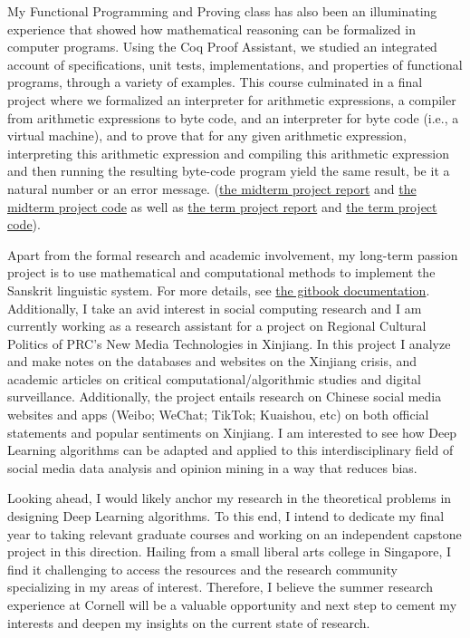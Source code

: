 \documentclass[11pt,reqno,oneside,a4paper]{article}
\begin{document}
	My Functional Programming and Proving class has also been an illuminating experience that showed how mathematical reasoning can be formalized in computer programs. Using the Coq Proof Assistant, we studied an integrated account of specifications, unit tests, implementations, and properties of functional programs, through a variety of examples. This course culminated in a final project where we formalized an interpreter for arithmetic expressions, a compiler from arithmetic expressions to byte code, and an interpreter for byte code (i.e., a virtual machine), and to prove that for any given arithmetic expression, interpreting this arithmetic expression and compiling this arithmetic expression and then running the resulting byte-code program yield the same result, be it a natural number or an error message. (\href{https://github.com/zhangliu6/course-submissions/blob/main/FPP_Midterm%20(4).pdf}{the midterm project report} and \href{https://github.com/zhangliu6/course-submissions/blob/main/midterm-project-liu-new.v}{the midterm project code} as well as \href{https://github.com/zhangliu6/course-submissions/blob/main/FPP_Term_Project_Report.pdf}{the term project report} and \href{https://github.com/zhangliu6/course-submissions/blob/main/term-project-liu-1.v}{the term project code}).
		
	Apart from the formal research and academic involvement, my long-term passion project is to use mathematical and computational methods to implement the Sanskrit linguistic system. For more details, see \href{https://zhangliu.gitbook.io/the-panini-machine/}{the gitbook documentation}. Additionally, I take an avid interest in social computing research and I am currently working as a research assistant  for a project on Regional Cultural Politics of PRC's New Media Technologies in Xinjiang. In this project I analyze and make notes on the databases and websites on the Xinjiang crisis, and academic articles on critical computational/algorithmic studies and digital surveillance. Additionally, the project entails research on Chinese social media websites and apps (Weibo; WeChat; TikTok; Kuaishou, etc) on both official statements and popular sentiments on Xinjiang. I am interested to see how Deep Learning algorithms can be adapted and applied to this interdisciplinary field of social media data analysis and opinion mining in a way that reduces bias.

	 Looking ahead, I would likely anchor my research in the theoretical problems in designing Deep Learning algorithms. To this end, I intend to dedicate my final year to taking relevant graduate courses and working on an independent capstone project in this direction. Hailing from a small liberal arts college in Singapore, I find it challenging to access the resources and the research community specializing in my areas of interest. Therefore, I believe the summer research experience at Cornell will be a valuable opportunity and next step to cement my interests and deepen my insights on the current state of research.  
	
\end{document}
